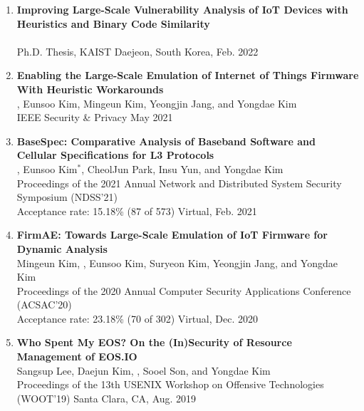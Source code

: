 \begin{enumerate}[leftmargin=1.5em]
    \item \textbf{Improving Large-Scale Vulnerability Analysis of IoT Devices with
    Heuristics and Binary Code Similarity} \\
        {\small
             \\
            Ph.D. Thesis, KAIST
        }
    \hfill {\small Daejeon, South Korea, Feb. 2022}


    \item \textbf{Enabling the Large-Scale Emulation of Internet of Things
        Firmware With Heuristic Workarounds} \\
        {\small
            , Eunsoo Kim, Mingeun Kim, Yeongjin Jang, and Yongdae Kim \\
            IEEE Security \& Privacy
        }
        \hfill {\small May 2021}

    \item \textbf{BaseSpec: Comparative Analysis of Baseband Software and Cellular Specifications for L3 Protocols} \\
        {\small
            , Eunsoo Kim$^\ast$, CheolJun Park, Insu Yun, and Yongdae Kim \\
            Proceedings of the 2021 Annual Network and Distributed System Security Symposium (NDSS'21) \\
            Acceptance rate: 15.18\% (87 of 573)
        }
        \hfill {\small Virtual, Feb. 2021}

    \item \textbf{FirmAE: Towards Large-Scale Emulation of IoT Firmware for Dynamic Analysis} \\
        {\small
            Mingeun Kim, , Eunsoo Kim, Suryeon Kim, Yeongjin Jang, and Yongdae Kim \\
            Proceedings of the 2020 Annual Computer Security Applications Conference (ACSAC'20)\\
            Acceptance rate: 23.18\% (70 of 302)
        }
        \hfill {\small Virtual, Dec. 2020}

    \item \textbf{Who Spent My EOS? On the (In)Security of Resource Management of EOS.IO} \\
        {\small
            Sangsup Lee, Daejun Kim, , Sooel Son, and Yongdae Kim \\
            Proceedings of the 13th USENIX Workshop on Offensive Technologies \\ (WOOT'19)
        } 
        \hfill {\small Santa Clara, CA, Aug. 2019}


\end{enumerate}
